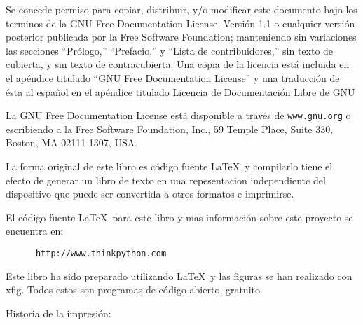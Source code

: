 \documentclass[letter,10pt]{book}
\newcommand{\clearemptydoublepage}{\newpage{\pagestyle{empty}\cleardoublepage}}
\begin{document}
\vspace{0.25in}

Se concede permiso para copiar, distribuir, y/o modificar este documento bajo
los terminos de la GNU Free Documentation License, Versión 1.1 o cualquier
versión posterior publicada por la Free Software Foundation; manteniendo 
sin variaciones las secciones ``Prólogo,'' ``Prefacio,'' y ``Lista de contribuidores,''
sin texto de cubierta, y sin texto de contracubierta. Una copia de la licencia
está incluida en el apéndice titulado ``GNU Free Documentation License'' y una 
traducción de ésta al español en el apéndice titulado Licencia de Documentación Libre de GNU

La GNU Free Documentation License está disponible a través de \texttt{www.gnu.org}
o escribiendo a la Free Software Foundation, Inc., 59 Temple Place,
Suite 330, Boston, MA 02111-1307, USA.

La forma original de este libro es código fuente \LaTeX\  y compilarlo
tiene el efecto de generar un libro de texto en una 
repesentacion independiente del dispositivo que puede ser convertida a otros 
formatos e imprimirse.

El código  fuente \LaTeX\  para este libro y mas información sobre este proyecto
se encuentra en:

\begin{verbatim}
      http://www.thinkpython.com
\end{verbatim}

Este libro ha sido preparado utilizando \LaTeX\ y las figuras
se han realizado con xfig.  Todos estos son programas de código
abierto, gratuito.

\vspace{0.25in}

Historia de la impresión:



\begin{verbatim}

\end{verbatim}



 	\clearemptydoublepage
  	\clearemptydoublepage
  	\clearemptydoublepage
	\clearemptydoublepage
\end{document}

